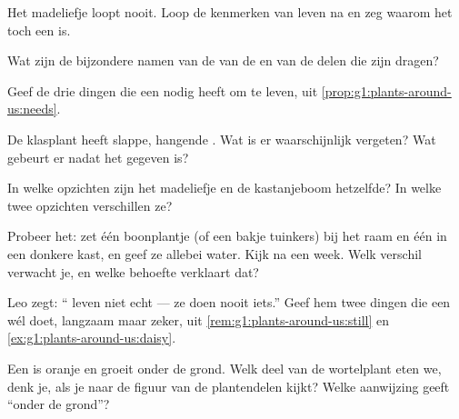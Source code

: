 \begin{exercise}[$\star$]\label{exo:g1:plants-around-us:3}
Het madeliefje loopt nooit. Loop de kenmerken van leven na en zeg
waarom het toch een  is.
\end{exercise}

\begin{exercise}[$\star$]\label{exo:g1:plants-around-us:4}
Wat zijn de bijzondere namen van de  van de  en van de delen
die zijn  dragen?
\end{exercise}

\begin{exercise}[$\star$]\label{exo:g1:plants-around-us:5}
Geef de drie dingen die een  nodig heeft om te leven, uit
\cref{prop:g1:plants-around-us:needs}.
\end{exercise}

\begin{exercise}[$\star$]\label{exo:g1:plants-around-us:6}
De klasplant heeft slappe, hangende . Wat is er waarschijnlijk
vergeten? Wat gebeurt er nadat het gegeven is?
\end{exercise}

\begin{exercise}[$\star$]\label{exo:g1:plants-around-us:7}
In welke opzichten zijn het madeliefje en de kastanjeboom hetzelfde? In
welke twee opzichten verschillen ze?
\end{exercise}

\begin{exercise}[$\star$]\label{exo:g1:plants-around-us:8}
Probeer het: zet één boonplantje (of een bakje tuinkers) bij het raam
en één in een donkere kast, en geef ze allebei water. Kijk na een week.
Welk verschil verwacht je, en welke behoefte verklaart dat?
\end{exercise}

\begin{exercise}[$\star\star$]\label{exo:g1:plants-around-us:9}
Leo zegt: `` leven niet echt --- ze doen nooit iets.'' Geef hem
twee dingen die een  wél doet, langzaam maar zeker, uit
\cref{rem:g1:plants-around-us:still} en
\cref{ex:g1:plants-around-us:daisy}.
\end{exercise}

\begin{exercise}[$\star\star$]\label{exo:g1:plants-around-us:10}
Een  is oranje en groeit onder de grond. Welk deel van de
wortelplant eten we, denk je, als je naar de figuur van de plantendelen
kijkt? Welke aanwijzing geeft ``onder de grond''?
\end{exercise}

